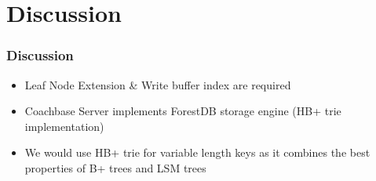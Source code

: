 \documentclass[aspectratio=169]{beamer}
\begin{document}
\section{Discussion}
\begin{frame}[t]
	\frametitle{Discussion}
	\begin{itemize}
		\item Leaf Node Extension \& Write buffer index are required
		\item Coachbase Server implements ForestDB storage engine (HB+ trie implementation)
		\item We would use HB+ trie for variable length keys as it combines the best properties of B+ trees and LSM trees
	\end{itemize}
	
\end{frame}
\end{document}

